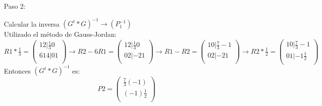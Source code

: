 \documentclass[
	11pt, %
]{beamer}
\begin{document}
\begin{frame}
  Paso 2:

  \bigskip %

  Calcular la inversa $(G^{t}*G)^{-1} \rightarrow (P_{1}^{-1})$\\

  Utilizado el método de Gauss-Jordan:\\

  $R1*\frac{1}{3} = \begin{pmatrix}
    1  2 | \frac{1}{3} 0\\
    6 14 | 0 1\\
  \end{pmatrix} \rightarrow R2 - 6R1 = \begin{pmatrix}
    1 2 | \frac{1}{3} 0\\
    0 2 | -2 1\\
  \end{pmatrix} \rightarrow R1-R2 = \begin{pmatrix}
    1 0 | \frac{7}{3} -1\\
    0 2 | -2 1\\
  \end{pmatrix} \rightarrow R2 * \frac{1}{2} = \begin{pmatrix}
    1 0 | \frac{7}{3} -1\\
    0 1 | -1 \frac{1}{2}\\
  \end{pmatrix}$\\

  Entonces $(G^{t}*G)^{-1}$ es: \\
  \[P2 = \begin{pmatrix}
    \frac{7}{3} (-1)\\
    (-1) \frac{1}{2}\\
  \end{pmatrix}\]
\end{frame}
\end{document}
